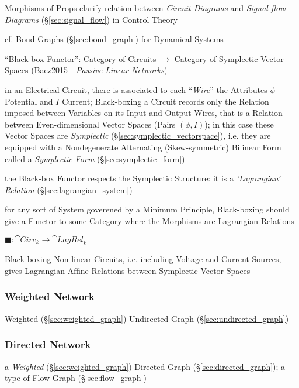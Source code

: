 Morphisms of Props clarify relation between \emph{Circuit Diagrams} and
\emph{Signal-flow Diagrams} (\S\ref{sec:signal_flow}) in Control Theory

cf. Bond Graphs (\S\ref{sec:bond_graph}) for Dynamical Systems

``Black-box Functor'': Category of Circuits $\rightarrow$ Category of
Symplectic Vector Spaces (Baez2015 - \emph{Passive Linear Networks})

in an Electrical Circuit, there is associated to each ``\emph{Wire}'' the
Attributes $\phi$ Potential and $I$ Current; Black-boxing a Circuit records
only the Relation imposed between Variables on its Input and Output Wires, that
is a Relation between Even-dimensional Vector Spaces (Pairs $(\phi,I)$); in
this case these Vector Spaces are \emph{Symplectic}
(\S\ref{sec:symplectic_vectorspace}), i.e. they are equipped with a
Nondegenerate Alternating (Skew-symmetric) Bilinear Form
called a \emph{Symplectic Form} (\S\ref{sec:symplectic_form})

the Black-box Functor respects the Symplectic Structure: it is a
\emph{'Lagrangian' Relation} (\S\ref{sec:lagrangian_system})

for any sort of System goverened by a Minimum Principle, Black-boxing should
give a Functor to some Category where the Morphisms are Lagrangian Relations

$\blacksquare : \cat{Circ}_k \rightarrow \cat{LagRel}_k$

Black-boxing Non-linear Circuits, i.e. including Voltage and Current Sources,
gives Lagrangian Affine Relations between Symplectic Vector Spaces



\subsubsection{Weighted Network}\label{sec:weighted_network}

Weighted (\S\ref{sec:weighted_graph}) Undirected Graph
(\S\ref{sec:undirected_graph})



\subsubsection{Directed Network}\label{sec:directed_network}

a \emph{Weighted} (\S\ref{sec:weighted_graph}) Directed Graph
(\S\ref{sec:directed_graph}); a type of Flow Graph (\S\ref{sec:flow_graph})

